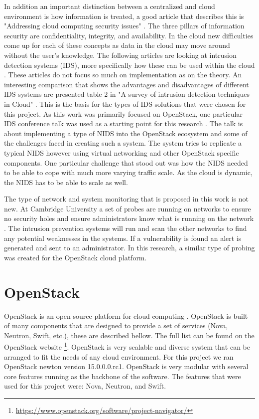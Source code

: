 \documentclass[12pt]{article}
\begin{document}
In addition an important distinction between a centralized and cloud environment is how information is treated, a good article that describes this is "Addressing cloud computing security issues" \cite{zissis2012addressing}. The three pillars of information security are confidentiality, integrity, and availability. In the cloud new difficulties come up for each of these concepts as data in the cloud may move around without the user's knowledge.  The following articles are looking at intrusion detection systems (IDS), more specifically how these can be used within the cloud \cite{SurveyOfIDS, patel2013intrusion}. These articles do not focus so much on implementation as on the theory. An interesting comparison that shows the advantages and disadvantages of different IDS systems are presented table $2$ in "A survey of intrusion detection techniques in Cloud" \cite{SurveyOfIDS}. This is the basis for the types of IDS solutions that were chosen for this project. As this work was primarily focused on OpenStack, one particular IDS conference talk was used as a starting point for this research \cite{videoPresentation}. The talk is about implementing a type of NIDS into the OpenStack ecosystem and some of the challenges faced in creating such a system. The system tries to replicate a typical NIDS however using virtual networking and other OpenStack specific components. One particular challenge that stood out was how the NIDS needed to be able to cope with much more varying traffic scale. As the cloud is dynamic, the NIDS has to be able to scale as well.

The type of network and system monitoring that is proposed in this work is not new. At Cambridge University a set of probes are running on networks to ensure no security holes and ensure administrators know what is running on the network \cite{CambUni}. The intrusion prevention systems will run and scan the other networks to find any potential weaknesses in the systems. If a vulnerability is found an alert is generated and sent to an administrator. In this research, a similar type of probing was created for the OpenStack cloud platform.

\section{OpenStack}
OpenStack is an open source platform for cloud computing \cite{OpenStack}. OpenStack is built of many components that are designed to provide a set of services (Nova, Neutron, Swift, etc.), these are described bellow. The full list can be found on the OpenStack website \footnote{ \href{https://www.openstack.org/software/project-navigator/}{https://www.openstack.org/software/project-navigator/}}. OpenStack is very scalable and diverse system that can be arranged to fit the needs of any cloud environment. For this project we ran OpenStack newton version 15.0.0.0.rc1. OpenStack is very modular with several core features running as the backbone of the software. The features that were used for this project were: Nova, Neutron, and Swift.
\end{document}
